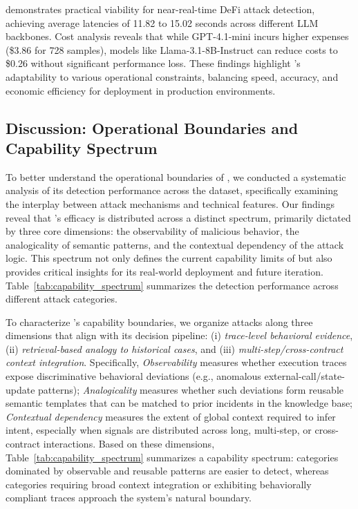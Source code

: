 \begin{tcolorbox}[colback=black!5!white, colframe=black!75!black, sharp corners, fontupper=\small, title=Answer to RQ4, label=box:takeaways]
\approach{} demonstrates practical viability for near-real-time DeFi attack detection, achieving average latencies of 11.82 to 15.02 seconds across different LLM backbones. Cost analysis reveals that while GPT-4.1-mini incurs higher expenses (\$3.86 for 728 samples), models like Llama-3.1-8B-Instruct can reduce costs to \$0.26 without significant performance loss. These findings highlight \approach{}'s adaptability to various operational constraints, balancing speed, accuracy, and economic efficiency for deployment in production environments.
\end{tcolorbox}

\subsection{Discussion: Operational Boundaries and Capability Spectrum}

To better understand the operational boundaries of \approach{}, we conducted a systematic analysis of its detection performance across the \dsystem{} dataset, specifically examining the interplay between attack mechanisms and technical features. Our findings reveal that \approach{}'s efficacy is distributed across a distinct spectrum, primarily dictated by three core dimensions: the observability of malicious behavior, the analogicality of semantic patterns, and the contextual dependency of the attack logic. This spectrum not only defines the current capability limits of \approach{} but also provides critical insights for its real-world deployment and future iteration. Table~\ref{tab:capability_spectrum} summarizes the detection performance across different attack categories.

To characterize \approach{}'s capability boundaries, we organize attacks along three dimensions that align with its decision pipeline: (i) \emph{trace-level behavioral evidence}, (ii) \emph{retrieval-based analogy to historical cases}, and (iii) \emph{multi-step/cross-contract context integration}. Specifically, \textit{Observability} measures whether execution traces expose discriminative behavioral deviations (e.g., anomalous external-call/state-update patterns); \textit{Analogicality} measures whether such deviations form reusable semantic templates that can be matched to prior incidents in the knowledge base; \textit{Contextual dependency} measures the extent of global context required to infer intent, especially when signals are distributed across long, multi-step, or cross-contract interactions.
Based on these dimensions, Table~\ref{tab:capability_spectrum} summarizes a capability spectrum: categories dominated by observable and reusable patterns are easier to detect, whereas categories requiring broad context integration or exhibiting behaviorally compliant traces approach the system’s natural boundary.

